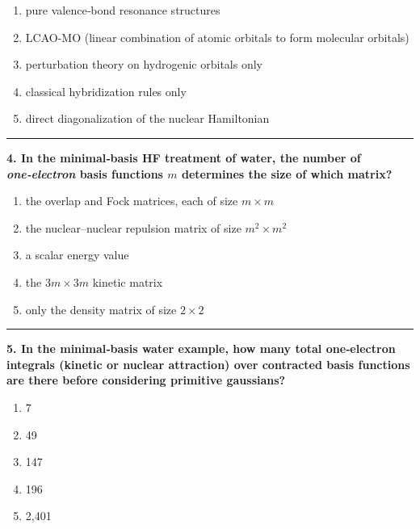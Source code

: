 \documentclass[
  english,
  9pt,
]{extbook}
\providecommand{\tightlist}{%
  \setlength{\itemsep}{0pt}\setlength{\parskip}{0pt}}
\theoremstyle{definition}
\theoremstyle{definition}
\theoremstyle{definition}
\theoremstyle{definition}
\theoremstyle{remark}
\begin{document}
\begin{enumerate}
\def\labelenumi{\alph{enumi}.}
\tightlist
\item
  pure valence‑bond resonance structures\\
\item
  LCAO-MO (linear combination of atomic orbitals to form molecular orbitals)\\
\item
  perturbation theory on hydrogenic orbitals only\\
\item
  classical hybridization rules only\\
\item
  direct diagonalization of the nuclear Hamiltonian
\end{enumerate}

\begin{center}\rule{0.5\linewidth}{0.5pt}\end{center}

\textbf{4. In the minimal‑basis HF treatment of water, the number of \emph{one‑electron} basis functions \(m\) determines the size of which matrix?}

\begin{enumerate}
\def\labelenumi{\alph{enumi}.}
\tightlist
\item
  the overlap and Fock matrices, each of size \(m \times m\)\\
\item
  the nuclear--nuclear repulsion matrix of size \(m^2 \times m^2\)\\
\item
  a scalar energy value\\
\item
  the \(3m\times 3m\) kinetic matrix\\
\item
  only the density matrix of size \(2\times 2\)
\end{enumerate}

\begin{center}\rule{0.5\linewidth}{0.5pt}\end{center}

\textbf{5. In the minimal‑basis water example, how many total one‑electron integrals (kinetic or nuclear attraction) over contracted basis functions are there before considering primitive gaussians?}

\begin{enumerate}
\def\labelenumi{\alph{enumi}.}
\tightlist
\item
  7\\
\item
  49\\
\item
  147\\
\item
  196\\
\item
  2,401
\end{enumerate}
\end{document}

